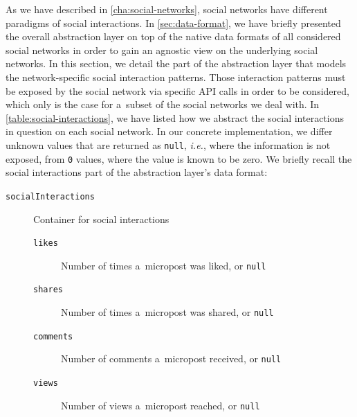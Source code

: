 As we have described in \autoref{cha:social-networks},
social networks have different paradigms of social interactions.
In \autoref{sec:data-format}, we have briefly presented the overall
abstraction layer on top of the native data formats
of all considered social networks in order to gain
an agnostic view on the underlying social networks.
In this section, we detail the part of the abstraction layer
that models the network-specific social interaction patterns.
Those interaction patterns must be exposed by the social network 
via specific API calls in order to be considered,
which only is the case for a~subset of the social networks we deal with.
In \autoref{table:social-interactions}, we have listed
how we abstract the social interactions in question on each social network.
In our concrete implementation, we differ unknown values
that are returned as \texttt{null}, \emph{i.e.},
where the information is not exposed,
from \texttt{0} values, where the value is known to be zero.
We briefly recall the social interactions part
of the abstraction layer's data format:

\begin{description}
  \item[\texttt{socialInteractions}] Container for social
    interactions
  \begin{description}  
  \item[\texttt{likes}] Number of times a~micropost was liked, or
    \texttt{null}
  \item[\texttt{shares}] Number of times a~micropost was shared, or
    \texttt{null}
  \item[\texttt{comments}] Number of comments a~micropost
    received, or \texttt{null}
  \item[\texttt{views}] Number of views a~micropost reached, or
    \texttt{null}
  \end{description}    
\end{description}

